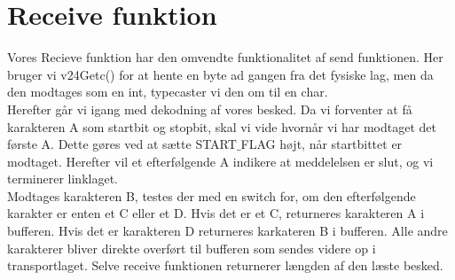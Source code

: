 \section{Receive funktion}
Vores Recieve funktion har den omvendte funktionalitet af send funktionen. Her bruger vi v24Getc() for at hente en byte ad gangen fra det fysiske lag, men da den modtages som en int, typecaster vi den om til en char.\\ Herefter går vi igang med dekodning af vores besked. Da vi forventer at få karakteren A som startbit og stopbit, skal vi vide hvornår vi har modtaget det første A. Dette gøres ved at sætte START$\_$FLAG højt, når startbittet er modtaget. Herefter vil et efterfølgende A indikere at meddelelsen er slut, og vi terminerer linklaget.\\ Modtages karakteren B, testes der med en switch for, om den efterfølgende karakter er enten et C eller et D. Hvis det er et C, returneres karakteren A i bufferen. Hvis det er karakteren D returneres karkateren B i bufferen. Alle andre karakterer bliver direkte overført til bufferen som sendes videre op i transportlaget. Selve receive funktionen returnerer længden af den læste besked.
